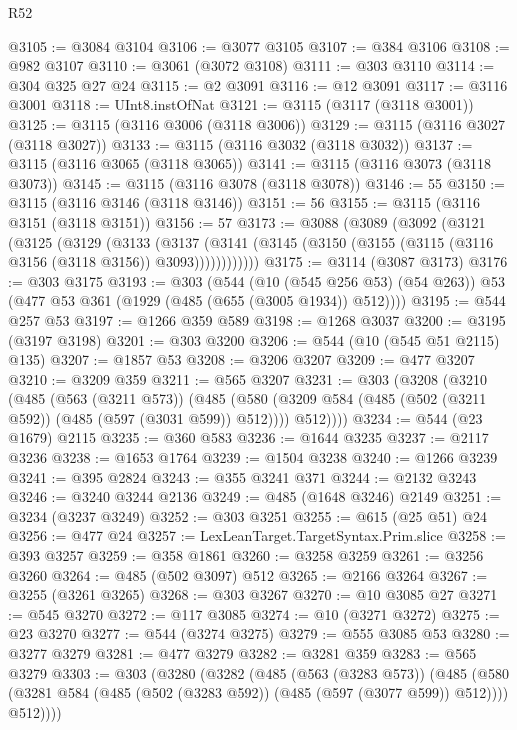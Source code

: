 \begin{lexlean}{R52}
\begin{coremodule}
@3105 := @3084 @3104
@3106 := @3077 @3105
@3107 := @384 @3106
@3108 := @982 @3107
@3110 := @3061 (@3072 @3108)
@3111 := @303 @3110
@3114 := @304 @325 @27 @24
@3115 := @2 @3091
@3116 := @12 @3091
@3117 := @3116 @3001
@3118 := UInt8.instOfNat
@3121 := @3115 (@3117 (@3118 @3001))
@3125 := @3115 (@3116 @3006 (@3118 @3006))
@3129 := @3115 (@3116 @3027 (@3118 @3027))
@3133 := @3115 (@3116 @3032 (@3118 @3032))
@3137 := @3115 (@3116 @3065 (@3118 @3065))
@3141 := @3115 (@3116 @3073 (@3118 @3073))
@3145 := @3115 (@3116 @3078 (@3118 @3078))
@3146 := 55
@3150 := @3115 (@3116 @3146 (@3118 @3146))
@3151 := 56
@3155 := @3115 (@3116 @3151 (@3118 @3151))
@3156 := 57
@3173 := @3088
    (@3089
      (@3092
        (@3121
          (@3125
            (@3129
              (@3133
                (@3137
                  (@3141 (@3145 (@3150 (@3155 (@3115 (@3116 @3156 (@3118 @3156)) @3093))))))))))))
@3175 := @3114 (@3087 @3173)
@3176 := @303 @3175
@3193 := @303
    (@544
      (@10 (@545 @256 @53) (@54 @263))
      @53
      (@477 @53 @361 (@1929 (@485 (@655 (@3005 @1934)) @512))))
@3195 := @544 @257 @53
@3197 := @1266 @359 @589
@3198 := @1268 @3037
@3200 := @3195 (@3197 @3198)
@3201 := @303 @3200
@3206 := @544 (@10 (@545 @51 @2115) @135)
@3207 := @1857 @53
@3208 := @3206 @3207
@3209 := @477 @3207
@3210 := @3209 @359
@3211 := @565 @3207
@3231 := @303
    (@3208
      (@3210
        (@485
          (@563 (@3211 @573))
          (@485
            (@580 (@3209 @584 (@485 (@502 (@3211 @592)) (@485 (@597 (@3031 @599)) @512))))
            @512))))
@3234 := @544 (@23 @1679) @2115
@3235 := @360 @583
@3236 := @1644 @3235
@3237 := @2117 @3236
@3238 := @1653 @1764
@3239 := @1504 @3238
@3240 := @1266 @3239
@3241 := @395 @2824
@3243 := @355 @3241 @371
@3244 := @2132 @3243
@3246 := @3240 @3244 @2136
@3249 := @485 (@1648 @3246) @2149
@3251 := @3234 (@3237 @3249)
@3252 := @303 @3251
@3255 := @615 (@25 @51) @24
@3256 := @477 @24
@3257 := LexLeanTarget.TargetSyntax.Prim.slice
@3258 := @393 @3257
@3259 := @358 @1861
@3260 := @3258 @3259
@3261 := @3256 @3260
@3264 := @485 (@502 @3097) @512
@3265 := @2166 @3264
@3267 := @3255 (@3261 @3265)
@3268 := @303 @3267
@3270 := @10 @3085 @27
@3271 := @545 @3270
@3272 := @117 @3085
@3274 := @10 (@3271 @3272)
@3275 := @23 @3270
@3277 := @544 (@3274 @3275)
@3279 := @555 @3085 @53
@3280 := @3277 @3279
@3281 := @477 @3279
@3282 := @3281 @359
@3283 := @565 @3279
@3303 := @303
    (@3280
      (@3282
        (@485
          (@563 (@3283 @573))
          (@485
            (@580 (@3281 @584 (@485 (@502 (@3283 @592)) (@485 (@597 (@3077 @599)) @512))))
            @512))))

\end{coremodule}
\end{lexlean}
